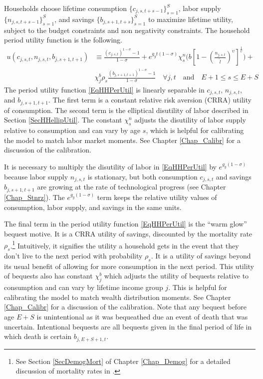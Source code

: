   Households choose lifetime consumption $\{c_{j,s,t+s-1}\}_{s=1}^S$, labor supply $\{n_{j,s,t+s-1}\}_{s=1}^S$, and savings $\{b_{j,s+1,t+s}\}_{s=1}^{S}$ to maximize lifetime utility, subject to the budget constraints and non negativity constraints. The household period utility function is the following.
  \begin{equation}\label{EqHHPerUtil}
    \begin{split}
      u(c_{j,s,t},n_{j,s,t},b_{j,s+1,t+1}) &\equiv \frac{(c_{j,s,t})^{1-\sigma} - 1}{1-\sigma} + e^{g_y t(1-\sigma)}\chi^n_s\biggl(b\left[1 - \left(\frac{n_{j,s,t}}{\tilde{l}}\right)^\upsilon\right]^{\frac{1}{\upsilon}}\biggr) + \\
      &\chi^b_j \rho_s \frac{(b_{j,s+1,t+1})^{1-\sigma} - 1}{1-\sigma} \quad\forall j,t \quad\text{and}\quad E+1 \leq s \leq E+S
    \end{split}
  \end{equation}
  The period utility function \eqref{EqHHPerUtil} is linearly separable in $c_{j,s,t}$, $n_{j,s,t}$, and $b_{j,s+1,t+1}$. The first term is a constant relative risk aversion (CRRA) utility of consumption. The second term is the elliptical disutility of labor described in Section \ref{SecHHellipUtil}. The constant $\chi^n_s$ adjusts the disutility of labor supply relative to consumption and can vary by age $s$, which is helpful for calibrating the model to match labor market moments. See Chapter \ref{Chap_Calibr} for a discussion of the calibration.

  It is necessary to multiply the disutility of labor in \eqref{EqHHPerUtil} by $e^{g_y(1-\sigma)}$ because labor supply $n_{j,s,t}$ is stationary, but both consumption $c_{j,s,t}$ and savings $b_{j,s+1,t+1}$ are growing at the rate of technological progress (see Chapter \ref{Chap_Stnrz}). The $e^{g_y(1-\sigma)}$ term keeps the relative utility values of consumption, labor supply, and savings in the same units.

  The final term in the period utility function \eqref{EqHHPerUtil} is the ``warm glow'' bequest motive. It is a CRRA utility of savings, discounted by the mortality rate $\rho_s$.\footnote{See Section \ref{SecDemogMort} of Chapter \ref{Chap_Demog} for a detailed discussion of mortality rates in \ogindia.} Intuitively, it signifies the utility a household gets in the event that they don't live to the next period with probability $\rho_s$. It is a utility of savings beyond its usual benefit of allowing for more consumption in the next period. This utility of bequests also has constant $\chi^b_j$ which adjusts the utility of bequests relative to consumption and can vary by lifetime income group $j$. This is helpful for calibrating the model to match wealth distribution moments. See Chapter \ref{Chap_Calibr} for a discussion of the calibration. Note that any bequest before age $E+S$ is unintentional as it was bequeathed due an event of death that was uncertain. Intentional bequests are all bequests given in the final period of life in which death is certain $b_{j,E+S+1,t}$.

